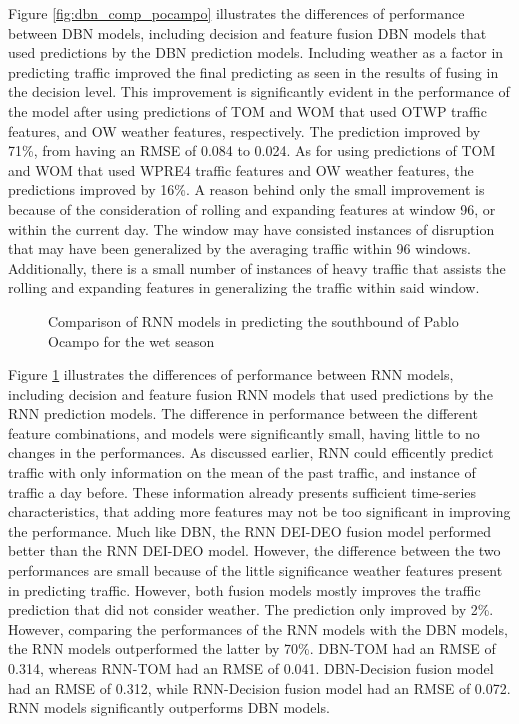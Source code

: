 Figure \ref{fig:dbn_comp_pocampo} illustrates the differences of performance between DBN models, including decision and feature fusion DBN models that used predictions by the DBN prediction models. Including weather as a factor in predicting traffic improved the final predicting as seen in the results of fusing in the decision level. This improvement is significantly evident in the performance of the model after using predictions of TOM and WOM that used OTWP traffic features, and OW weather features, respectively. The prediction improved by 71\%, from having an RMSE of 0.084 to 0.024. As for using predictions of TOM and WOM that used WPRE4 traffic features and OW weather features, the predictions improved by 16\%. A reason behind only the small improvement is because of the consideration of rolling and expanding features at window 96, or within the current day. The window may have consisted instances of disruption that may have been generalized by the averaging traffic within 96 windows. Additionally, there is a small number of instances of heavy traffic that assists the rolling and expanding features in generalizing the traffic within said window. 


\begin{figure}[h]
  \centering
  \captionsetup{justification=centering}
  \caption{Comparison of RNN models in predicting the southbound of Pablo Ocampo for the wet season}
  \label{fig:rnn_comp_pocampo}
\end{figure}

Figure \ref{fig:rnn_comp_pocampo} illustrates the differences of performance between RNN models, including decision and feature fusion RNN models that used predictions by the RNN prediction models. 
The difference in performance between the different feature combinations, and models were significantly small, having little to no changes in the performances. As discussed earlier, RNN could efficently predict traffic with only information on the mean of the past traffic, and instance of traffic a day before. These information already presents sufficient time-series characteristics, that adding more features may not be too significant in improving the performance. Much like DBN, the RNN DEI-DEO fusion model performed better than the RNN DEI-DEO model. However, the difference between the two performances are small because of the little significance weather features present in predicting traffic. However, both fusion models mostly improves the traffic prediction that did not consider weather. The prediction only improved by 2\%. However, comparing the performances of the RNN models with the DBN models, the RNN models outperformed the latter by 70\%. DBN-TOM had an RMSE of 0.314, whereas RNN-TOM had an RMSE of 0.041. DBN-Decision fusion model had an RMSE of 0.312, while RNN-Decision fusion model had an RMSE of 0.072. RNN models significantly outperforms DBN models. 

